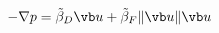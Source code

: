 \documentclass{minimal}
\begin{document}
 \begin{align*}
-\nabla p = \tilde{\beta}_{D}{\vb u} + \tilde{\beta}_{F} \|{\vb u}\|{\vb u}
 \end{align*}
 
\end{document}
